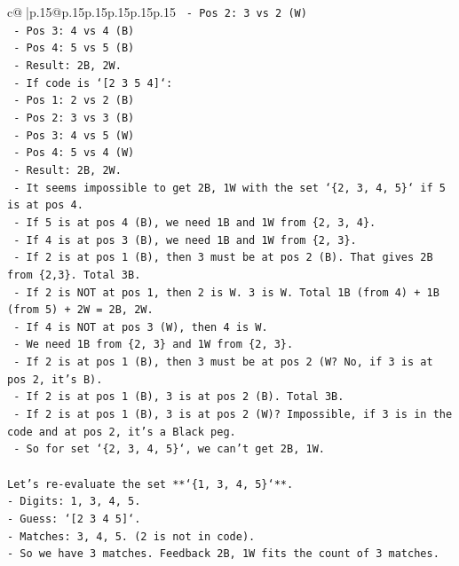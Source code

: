 \documentclass{article}
\begin{document}
{\begin{supertabular}{c@{$\;$}|p{.15\linewidth}@{}p{.15\linewidth}p{.15\linewidth}p{.15\linewidth}p{.15\linewidth}p{.15\linewidth}}
{{{\texttt{    {-} Pos 2: 3 vs 2 (W)} \\
\texttt{    {-} Pos 3: 4 vs 4 (B)} \\
\texttt{    {-} Pos 4: 5 vs 5 (B)} \\
\texttt{    {-} Result: 2B, 2W.} \\
\texttt{  {-} If code is `{[}2 3 5 4{]}`:} \\
\texttt{    {-} Pos 1: 2 vs 2 (B)} \\
\texttt{    {-} Pos 2: 3 vs 3 (B)} \\
\texttt{    {-} Pos 3: 4 vs 5 (W)} \\
\texttt{    {-} Pos 4: 5 vs 4 (W)} \\
\texttt{    {-} Result: 2B, 2W.} \\
\texttt{  {-} It seems impossible to get 2B, 1W with the set `\{2, 3, 4, 5\}` if 5 is at pos 4.} \\
\texttt{    {-} If 5 is at pos 4 (B), we need 1B and 1W from \{2, 3, 4\}.} \\
\texttt{    {-} If 4 is at pos 3 (B), we need 1B and 1W from \{2, 3\}.} \\
\texttt{      {-} If 2 is at pos 1 (B), then 3 must be at pos 2 (B). That gives 2B from \{2,3\}. Total 3B.} \\
\texttt{      {-} If 2 is NOT at pos 1, then 2 is W. 3 is W. Total 1B (from 4) + 1B (from 5) + 2W = 2B, 2W.} \\
\texttt{    {-} If 4 is NOT at pos 3 (W), then 4 is W.} \\
\texttt{      {-} We need 1B from \{2, 3\} and 1W from \{2, 3\}.} \\
\texttt{      {-} If 2 is at pos 1 (B), then 3 must be at pos 2 (W? No, if 3 is at pos 2, it's B).} \\
\texttt{      {-} If 2 is at pos 1 (B), 3 is at pos 2 (B). Total 3B.} \\
\texttt{      {-} If 2 is at pos 1 (B), 3 is at pos 2 (W)? Impossible, if 3 is in the code and at pos 2, it's a Black peg.} \\
\texttt{      {-} So for set `\{2, 3, 4, 5\}`, we can't get 2B, 1W.} \\
\\ 
\texttt{Let's re{-}evaluate the set **`\{1, 3, 4, 5\}`**.} \\
\texttt{{-} Digits: 1, 3, 4, 5.} \\
\texttt{{-} Guess: `{[}2 3 4 5{]}`.} \\
\texttt{{-} Matches: 3, 4, 5. (2 is not in code).} \\
\texttt{{-} So we have 3 matches. Feedback 2B, 1W fits the count of 3 matches.} \\
}}}
\end{supertabular}}
\end{document}
